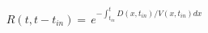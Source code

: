 \begin{equation}
R(t,t-t_{in}) = \frac{}{} e^{-\int_{t_{in}}^t D(x,t_{in})/V(x,t_{in}) dx}
\end{equation}